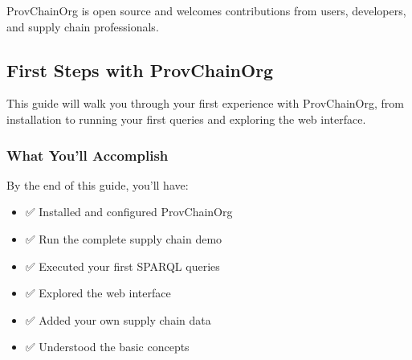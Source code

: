 \documentclass[letterpaper,10pt,english]{sphinxmanual}
\begin{document}
\sphinxAtStartPar
ProvChainOrg is open source and welcomes contributions from users, developers, and supply chain professionals.



\sphinxstepscope


\subsection{First Steps with ProvChainOrg}
\label{\detokenize{user-guide/first-steps:first-steps-with-provchainorg}}\label{\detokenize{user-guide/first-steps::doc}}
\sphinxAtStartPar
This guide will walk you through your first experience with ProvChainOrg, from installation to running your first queries and exploring the web interface.




\subsubsection{What You’ll Accomplish}
\label{\detokenize{user-guide/first-steps:what-you-ll-accomplish}}
\sphinxAtStartPar
By the end of this guide, you’ll have:
\begin{itemize}
\item {} 
\sphinxAtStartPar
✅ Installed and configured ProvChainOrg

\item {} 
\sphinxAtStartPar
✅ Run the complete supply chain demo

\item {} 
\sphinxAtStartPar
✅ Executed your first SPARQL queries

\item {} 
\sphinxAtStartPar
✅ Explored the web interface

\item {} 
\sphinxAtStartPar
✅ Added your own supply chain data

\item {} 
\sphinxAtStartPar
✅ Understood the basic concepts

\end{itemize}
\end{document}
